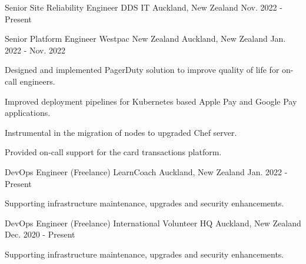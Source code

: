 


\begin{cventries}


\cventry
{Senior Site Reliability Engineer} %
{DDS IT} %
{Auckland, New Zealand} %
{Nov. 2022 - Present} %


\cventry
{Senior Platform Engineer} %
{Westpac New Zealand} %
{Auckland, New Zealand} %
{Jan. 2022 - Nov. 2022} %
{ %
\begin{cvitems}
\item {Designed and implemented PagerDuty solution to improve quality of life for on-call engineers.}
\item {Improved deployment pipelines for Kubernetes based Apple Pay and Google Pay applications.}
\item {Instrumental in the migration of nodes to upgraded Chef server.}
\item {Provided on-call support for the card transactions platform.}
\end{cvitems}
}


\cventry
{DevOps Engineer (Freelance)} %
{LearnCoach} %
{Auckland, New Zealand} %
{Jan. 2022 - Present} %
{ %
\begin{cvitems}
\item {Supporting infrastructure maintenance, upgrades and security enhancements.}
\end{cvitems}
}


\cventry
{DevOps Engineer (Freelance)} %
{International Volunteer HQ} %
{Auckland, New Zealand} %
{Dec. 2020 - Present} %
{ %
\begin{cvitems}
\item {Supporting infrastructure maintenance, upgrades and security enhancements.}
\end{cvitems}
}


\end{cventries}
